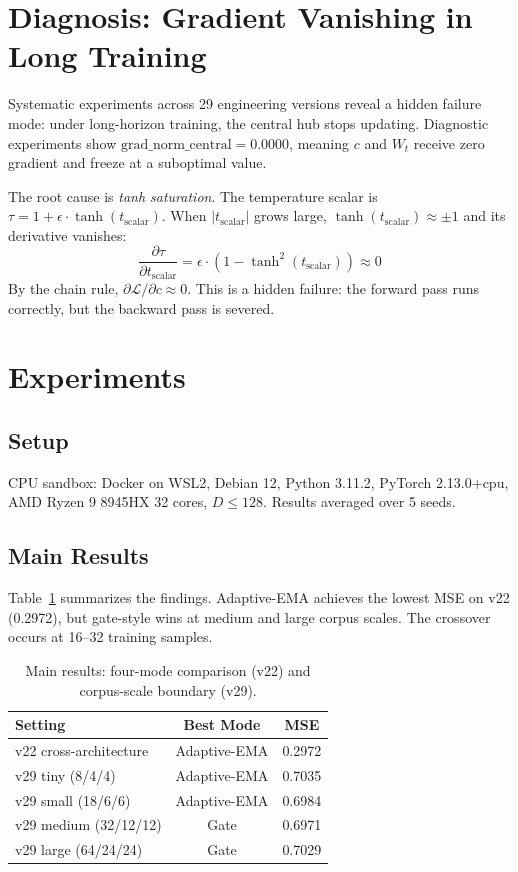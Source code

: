 \documentclass[10pt,twoside]{article}
\theoremstyle{definition}
\begin{document}
\section{Diagnosis: Gradient Vanishing in Long Training}
\label{sec:diagnosis}

Systematic experiments across 29 engineering versions reveal a hidden failure mode: under long-horizon training, the central hub stops updating. Diagnostic experiments show $\text{grad\_norm\_central} = 0.0000$, meaning $c$ and $W_t$ receive zero gradient and freeze at a suboptimal value.

The root cause is \textit{tanh saturation}. The temperature scalar is $\tau = 1 + \epsilon \cdot \tanh(t_{\text{scalar}})$. When $|t_{\text{scalar}}|$ grows large, $\tanh(t_{\text{scalar}}) \approx \pm 1$ and its derivative vanishes:
\begin{equation}
    \frac{\partial \tau}{\partial t_{\text{scalar}}} = \epsilon \cdot (1 - \tanh^2(t_{\text{scalar}})) \approx 0
\end{equation}
By the chain rule, $\partial \mathcal{L}/\partial c \approx 0$. This is a hidden failure: the forward pass runs correctly, but the backward pass is severed.

\section{Experiments}

\subsection{Setup}

CPU sandbox: Docker on WSL2, Debian 12, Python 3.11.2, PyTorch 2.13.0+cpu, AMD Ryzen 9 8945HX 32 cores, $D \leq 128$. Results averaged over 5 seeds.

\subsection{Main Results}

Table~\ref{tab:main_results} summarizes the findings. Adaptive-EMA achieves the lowest MSE on v22 (0.2972), but gate-style wins at medium and large corpus scales. The crossover occurs at 16--32 training samples.

\begin{table}[ht]
\centering
\caption{Main results: four-mode comparison (v22) and corpus-scale boundary (v29).}
\label{tab:main_results}
\begin{tabular}{lcc}
\toprule
\textbf{Setting} & \textbf{Best Mode} & \textbf{MSE} \\
\midrule
v22 cross-architecture & Adaptive-EMA & 0.2972 \\
v29 tiny (8/4/4) & Adaptive-EMA & 0.7035 \\
v29 small (18/6/6) & Adaptive-EMA & 0.6984 \\
v29 medium (32/12/12) & Gate & 0.6971 \\
v29 large (64/24/24) & Gate & 0.7029 \\
\bottomrule
\end{tabular}
\end{table}
\end{document}
